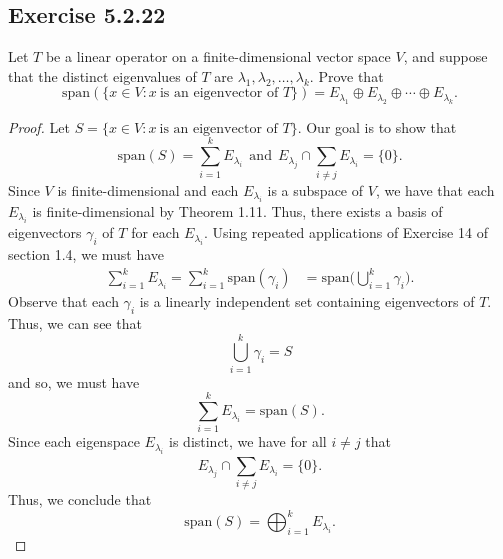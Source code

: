\subsection*{Exercise 5.2.22} Let \( T  \) be a linear operator on a finite-dimensional vector space \( V  \), and suppose that the distinct eigenvalues of \( T  \) are \( {\lambda}_{1}, {\lambda}_{2}, \dots, {\lambda}_{k} \). Prove that
\[  \text{span}(\{ x \in V : x \ \text{is an eigenvector of } T  \} ) = {E}_{{\lambda}_{1}} \oplus {E}_{{\lambda}_{2}} \oplus \cdots \oplus {E}_{\lambda_{k }}. \]
\begin{proof}
Let \( S =  \{ x \in V : x \ \text{is an eigenvector of } T  \}  \). Our goal is to show that 
\[  \text{span}(S) = \sum_{ i=1  }^{ k  } {E}_{{\lambda}_{i}} \ \  \text{and} \ \ {E}_{{\lambda}_{j}} \cap \sum_{ i \neq j  }^{  } {E}_{{\lambda}_{i}} = \{ 0 \}.   \]
Since \( V  \) is finite-dimensional and each \( {E}_{{\lambda}_{i}} \) is a subspace of \( V \), we have that each \( {E}_{{\lambda}_{i}} \) is finite-dimensional by Theorem 1.11. Thus, there exists a basis of eigenvectors \( {\gamma}_{i} \) of \( T  \) for each \( {E}_{{\lambda}_{i}} \). Using repeated applications of Exercise 14 of section 1.4, we must have
\begin{align*}
    \sum_{ i=1  }^{ k  } {E}_{{\lambda}_{i}} = \sum_{ i=1  }^{ k  } \text{span}({\gamma}_{i}) &= \text{span} \Big(  \bigcup_{ i=1  }^{ k  } {\gamma}_{i} \Big).
\end{align*}
Observe that each \( \gamma_{i} \) is a linearly independent set containing eigenvectors of \( T  \). Thus, we can see that   
\[  \bigcup_{ i=1  }^{ k  }  {\gamma}_{i} = S \]
and so, we must have
\[  \sum_{ i=1  }^{ k  } {E}_{{\lambda}_{i}} = \text{span}(S). \]
Since each eigenspace \( {E}_{{\lambda}_{i}} \) is distinct, we have for all \( i \neq j  \) that
\[ {E}_{{\lambda}_{j}} \cap \sum_{ i \neq j  }^{  } {E}_{{\lambda}_{i}} = \{ 0 \}.   \]
Thus, we conclude that
\[  \text{span}(S) = \bigoplus_{i=1}^{k} {E}_{{\lambda}_{i}}. \]

\end{proof}

